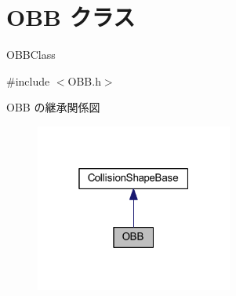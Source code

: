 \hypertarget{class_o_b_b}{}\section{O\+BB クラス}
\label{class_o_b_b}


O\+B\+B\+Class  




{\ttfamily \#include $<$O\+B\+B.\+h$>$}



O\+BB の継承関係図\nopagebreak
\begin{figure}[H]
\begin{center}
\leavevmode
\includegraphics[width=184pt]{class_o_b_b__inherit__graph}
\end{center}
\end{figure}

